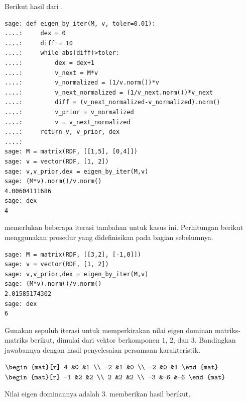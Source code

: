 \begin{exercises}
\begin{answer}
\begin{exparts}
         \partsitem Berikut hasil dari \Sage{}.
 \begin{lstlisting}
sage: def eigen_by_iter(M, v, toler=0.01):
....:     dex = 0
....:     diff = 10
....:     while abs(diff)>toler:
....:         dex = dex+1
....:         v_next = M*v
....:         v_normalized = (1/v.norm())*v
....:         v_next_normalized = (1/v_next.norm())*v_next
....:         diff = (v_next_normalized-v_normalized).norm()
....:         v_prior = v_normalized
....:         v = v_next_normalized
....:     return v, v_prior, dex
....: 
sage: M = matrix(RDF, [[1,5], [0,4]])
sage: v = vector(RDF, [1, 2])
sage: v,v_prior,dex = eigen_by_iter(M,v)
sage: (M*v).norm()/v.norm()
4.00604111686
sage: dex
4           
 \end{lstlisting}
      \partsitem \Sage{} memerlukan beberapa iterasi tambahan untuk kasus ini.
        Perhitungan berikut menggunakan prosedur yang didefinisikan pada bagian
        sebelumnya.
\begin{lstlisting}
sage: M = matrix(RDF, [[3,2], [-1,0]])
sage: v = vector(RDF, [1, 2])
sage: v,v_prior,dex = eigen_by_iter(M,v)
sage: (M*v).norm()/v.norm()
2.01585174302
sage: dex
6        
\end{lstlisting}
       \end{exparts}
     \end{answer}
  \item 
    Gunakan sepuluh iterasi untuk memperkirakan nilai eigen dominan matriks-
    matriks berikut, dimulai dari vektor berkomponen $1$, $2$, dan $3$.
    Bandingkan jawabannya dengan hasil penyelesaian persamaan karakteristik.
    \begin{exparts*}
      \partsitem $\begin{mat}[r]
                    4   &0  &1 \\
                    -2  &1  &0  \\
                    -2  &0  &1
                  \end{mat}$
      \partsitem $\begin{mat}[r]
                   -1  &2  &2  \\
                    2  &2  &2  \\
                   -3  &-6 &-6
                  \end{mat}$
    \end{exparts*}
    \begin{answer}
     \begin{exparts}
       \partsitem Nilai eigen dominannya adalah $3$.
         \Sage{} memberikan hasil berikut.

\end{exparts}
\end{answer}
\end{exercises}
